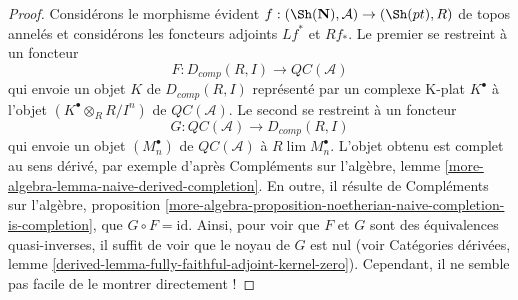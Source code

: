 \begin{proof}
Considérons le morphisme évident
$f : (\Sh(\mathbf{N}), \mathcal{A}) \to (\Sh(pt), R)$ de
topos annelés
et considérons les foncteurs adjoints $Lf^*$ et $Rf_*$. Le premier
se restreint à un foncteur
$$ F
: D_{comp}(R, I) \longrightarrow \mathit{QC}(\mathcal{A})
$$ qui
envoie un objet $K$ de $D_{comp}(R, I)$ représenté par un complexe
K-plat $K^\bullet$ à l'objet $(K^\bullet \otimes_R R/I^n)$ de
$\mathit{QC}(\mathcal{A})$. Le second se restreint à un foncteur
$$ G :
\mathit{QC}(\mathcal{A}) \longrightarrow D_{comp}(R, I)
$$ qui envoie un objet
$(M_n^\bullet)$ de $\mathit{QC}(\mathcal{A})$ à
$R\lim M_n^\bullet$. L'objet obtenu est complet au sens dérivé, par exemple d'après Compléments
sur l'algèbre, lemme \ref{more-algebra-lemma-naive-derived-completion}. En
outre, il résulte de Compléments sur l'algèbre, proposition
\ref{more-algebra-proposition-noetherian-naive-completion-is-completion},
que $G \circ F = \text{id}$. Ainsi, pour voir que $F$ et $G$
sont des équivalences quasi-inverses, il suffit de voir que le noyau
de $G$ est nul (voir Catégories dérivées, lemme
\ref{derived-lemma-fully-faithful-adjoint-kernel-zero}).
Cependant, il ne semble pas facile de le montrer directement !


\end{proof}
